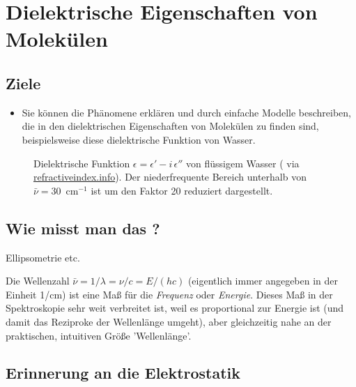 \renewcommand{\lastmod}{\today}

\chapter{Dielektrische Eigenschaften von Molekülen}




\section{Ziele}

\begin{itemize}
\item Sie können die Phänomene erklären und durch einfache Modelle beschreiben, die in den  dielektrischen Eigenschaften von Molekülen zu finden sind, beispielsweise diese dielektrische Funktion von Wasser.

\end{itemize}

\begin{figure}
\caption{Dielektrische Funktion $\epsilon = \epsilon' - i \, \epsilon''$ von flüssigem Wasser (\cite{Segelstein_water} via 
\href{https://refractiveindex.info/?shelf=main&book=H2O&page=Segelstein}{refractiveindex.info}). Der niederfrequente Bereich unterhalb von $\bar{\nu} = 30$~cm$^{-1}$ ist um den Faktor 20 reduziert dargestellt.
\label{fig:diel_water}}

\end{figure}

\section{Wie misst man das ?}

 Ellipsometrie etc.

Die Wellenzahl $\bar{\nu} = 1 / \lambda =\nu / c =  E / (h c)$ (eigentlich immer angegeben in der Einheit 1/cm) ist eine Maß für die  \emph{Frequenz} oder \emph{Energie}. Dieses Maß in der Spektroskopie sehr weit verbreitet ist, weil es proportional zur Energie ist (und damit das Reziproke der Wellenlänge umgeht), aber gleichzeitig nahe an der praktischen, intuitiven Größe 'Wellenlänge'.

\section{Erinnerung an die Elektrostatik }

